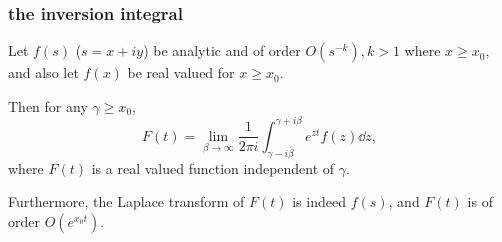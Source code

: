 \documentclass[mathserif]{beamer}
\newcommand{\br}[1]{\left(#1\right)}
\newcommand{\sbr}[1]{\left[#1\right]}
\begin{document}
%






\begin{frame}
  \frametitle{the inversion integral}


  \begin{theorem}
    Let $f(s)$ ($s = x+iy$) be analytic and of order $O(s^{-k}), k > 1$ where $x \geq x_0$, and also let $f(x)$ be real valued for $x\geq x_0$.
    
    Then for any $\gamma \geq x_0$, \[F(t) = \lim_{\beta \to \infty}\frac{1}{2\pi i}\int_{\gamma - i\beta}^{\gamma + i\beta}e^{zt}f(z)\dd{z},\] where $F(t)$ is a real valued function independent of $\gamma$.

    Furthermore, the Laplace transform of $F(t)$ is indeed $f(s)$, and $F(t)$ is of order $O(e^{x_0t})$.
  \end{theorem}


\end{frame}
\end{document}
